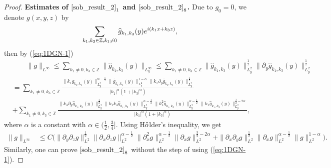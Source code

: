 \documentclass[12pt, reqno]{amsart}
\numberwithin{equation}{section}
\begin{document}
	\begin{proof}
		
		{\bf Estimates of $\eqref{sob_result_2}_1$ and $\eqref{sob_result_2}_8$.}
		Due to $g_0=0$, we denote $	g(x,y,z)$ by
		$$\sum_{k_1,k_3\in\mathbb{Z},k_1\neq0}\widehat{g}_{k_1,k_3}(y){\rm e}^{i(k_1x+k_3z)},$$
		then by (\ref{eq:1DGN-1})
		\begin{equation*}	
			\begin{aligned}
				&\qquad\|g\|_{L^{\infty}}\leq \sum_{k_1\neq0,k_3\in\mathbb{Z}}\|\widehat{g}_{k_1,k_3}(y)\|_{L^{\infty}_y}
				\leq \sum_{k_1\neq0 ,k_3\in\mathbb{Z}}\|\widehat{g}_{k_1,k_3}(y)\|^{\frac{1}{2}}_{L^2_y}
				\|\partial_y\widehat{g}_{k_1,k_3}(y)\|^{\frac{1}{2}}_{L^2_y}\\
				&= \sum_{k_1\neq0,k_3\in\mathbb{Z}}
				\frac{\|k_1\widehat{g}_{k_1,k_3}(y)\|^{\alpha-\frac{1}{2}}_{L^2_y}
					\|\widehat{g}_{k_1,k_3}(y)\|^{1-\alpha}_{L^2_y}
					\|k_1\partial_y\widehat{g}_{k_1,k_3}(y)\|^{\frac{1}{2}}_{L^2_y}}{|k_1|^{\alpha}(1+|k_3|^{\alpha})}\\
				&+\sum_{k_1\neq0,k_3\in\mathbb{Z}}
				\frac{		\|k_3\partial_y\widehat{g}_{k_1,k_3}(y)\|^{\frac{1}{2}}_{L^2_y}	\|k_1k_3\widehat{g}_{k_1,k_3}(y)\|^{\alpha-\frac{1}{2}}_{L^2_y}
					\|k_1^2\widehat{g}_{k_1,k_3}(y)\|^{\alpha-\frac{1}{2}}_{L^2_y}
					\|k_1\widehat{g}_{k_1,k_3}(y)\|^{\frac{3}{2}-2\alpha}_{L^2_y}}
				{|k_1|^{\alpha}(1+|k_3|^{\alpha})},
			\end{aligned}
		\end{equation*}	
		where $\alpha$ is a constant with $\alpha\in(\frac{1}{2},\frac{3}{4}].$
		Using H$\rm \ddot{o}$lder's inequality, we get
		\begin{equation*}	
			\begin{aligned}
				\|g\|_{L^{\infty}}&\leq 
				C\Big(\|\partial_y\partial_zg\|^{\frac{1}{2}}_{L^2}
				\|\partial_x\partial_zg\|^{\alpha-\frac{1}{2}}_{L^2}
				\|\partial_x^2g\|^{\alpha-\frac{1}{2}}_{L^2}
				\|\partial_xg\|^{\frac{3}{2}-2\alpha}_{L^2}+
				\|\partial_x\partial_yg\|^{\frac{1}{2}}_{L^2}
				\|\partial_xg\|^{\alpha-\frac{1}{2}}_{L^2}
				\|g\|^{1-\alpha}_{L^2}
				\Big).
			\end{aligned}
		\end{equation*}	
		Similarly, one can prove $\eqref{sob_result_2}_8$ without the step of  using (\ref{eq:1DGN-1}).
		

\end{proof}
\end{document}
